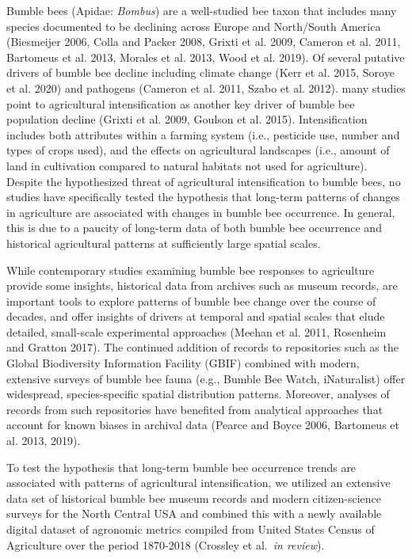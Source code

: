 \documentclass[11pt,]{article}
\begin{document}
Bumble bees (Apidae: \emph{Bombus}) are a well-studied bee taxon that
includes many species documented to be declining across Europe and
North/South America (Biesmeijer 2006, Colla and Packer 2008, Grixti et
al. 2009, Cameron et al. 2011, Bartomeus et al. 2013, Morales et al.
2013, Wood et al. 2019). Of several putative drivers of bumble bee
decline including climate change (Kerr et al. 2015, Soroye et al. 2020)
and pathogens (Cameron et al. 2011, Szabo et al. 2012). many studies
point to agricultural intensification as another key driver of bumble
bee population decline (Grixti et al. 2009, Goulson et al. 2015).
Intensification includes both attributes within a farming system (i.e.,
pesticide use, number and types of crops used), and the effects on
agricultural landscapes (i.e., amount of land in cultivation compared to
natural habitats not used for agriculture). Despite the hypothesized
threat of agricultural intensification to bumble bees, no studies have
specifically tested the hypothesis that long-term patterns of changes in
agriculture are associated with changes in bumble bee occurrence. In
general, this is due to a paucity of long-term data of both bumble bee
occurrence and historical agricultural patterns at sufficiently large
spatial scales.

While contemporary studies examining bumble bee responses to agriculture
provide some insights, historical data from archives such as museum
records, are important tools to explore patterns of bumble bee change
over the course of decades, and offer insights of drivers at temporal
and spatial scales that elude detailed, small-scale experimental
approaches (Meehan et al. 2011, Rosenheim and Gratton 2017). The
continued addition of records to repositories such as the Global
Biodiversity Information Facility (GBIF) combined with modern, extensive
surveys of bumble bee fauna (e.g., Bumble Bee Watch, iNaturalist) offer
widespread, species-specific spatial distribution patterns. Moreover,
analyses of records from such repositories have benefited from
analytical approaches that account for known biases in archival data
(Pearce and Boyce 2006, Bartomeus et al. 2013, 2019).

To test the hypothesis that long-term bumble bee occurrence trends are
associated with patterns of agricultural intensification, we utilized an
extensive data set of historical bumble bee museum records and modern
citizen-science surveys for the North Central USA and combined this with
a newly available digital dataset of agronomic metrics compiled from
United States Census of Agriculture over the period 1870-2018 (Crossley
et al.~\emph{in review}).
\end{document}
